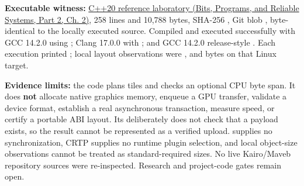 \textbf{Executable witness:} \href{../01-Bits-Programs-and-Reliable-Systems-P02/main.pdf\#source-file-f5eb017280bb6b2ae6b1475d}{C++20 reference laboratory (Bits, Programs, and Reliable Systems, Part 2, Ch. 2)}, 258 lines and 10,788 bytes, SHA-256 , Git blob , byte-identical to the locally executed source. Compiled and executed successfully with GCC 14.2.0 using ; Clang 17.0.0 with ; and GCC 14.2.0 release-style . Each execution printed ; local layout observations were ,  and  bytes on that Linux target.

\textbf{Evidence limits:} the code plans tiles and checks an optional CPU byte span. It does \textbf{not} allocate native graphics memory, enqueue a GPU transfer, validate a device format, establish a real asynchronous transaction, measure speed, or certify a portable ABI layout. Its  deliberately does not check that a payload exists, so the result cannot be represented as a verified upload.  supplies no synchronization, CRTP supplies no runtime plugin selection, and local object-size observations cannot be treated as standard-required sizes. No live Kairo/Maveb repository sources were re-inspected. Research and project-code gates remain open.

